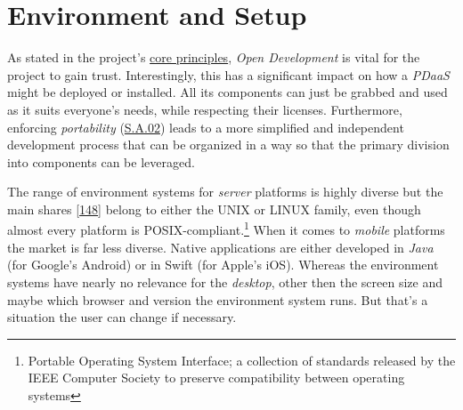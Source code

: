 \documentclass[12pt,english,a4paper,titlepage,cleardoublepage=empty,dottedtoc]{report}
\begin{document}
\section{Environment and Setup}\label{environment-and-setup}

As stated in the project's \protect\hyperlink{core-principles}{core
principles}, \emph{Open Development} is vital for the project to gain
trust. Interestingly, this has a significant impact on how a
\emph{PDaaS} might be deployed or installed. All its components can just
be grabbed and used as it suits everyone's needs, while respecting their
licenses. Furthermore, enforcing \emph{portability}
(\protect\hyperlink{sa02}{S.A.02}) leads to a more simplified and
independent development process that can be organized in a way so that
the primary division into components can be leveraged.

The range of environment systems for \emph{server} platforms is highly
diverse but the main shares
{[}\protect\hyperlink{ref-web_2017_wikipedia_os-market-share}{148}{]}
belong to either the UNIX or LINUX family, even though almost every
platform is POSIX-compliant.\footnote{Portable Operating System
  Interface; a collection of standards released by the IEEE Computer
  Society to preserve compatibility between operating systems} When it
comes to \emph{mobile} platforms the market is far less diverse. Native
applications are either developed in \emph{Java} (for Google's Android)
or in Swift (for Apple's iOS). Whereas the environment systems have
nearly no relevance for the \emph{desktop}, other then the screen size
and maybe which browser and version the environment system runs. But
that's a situation the user can change if necessary.
\end{document}
